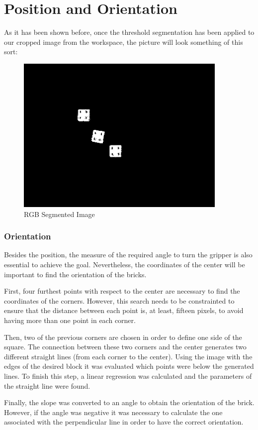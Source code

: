 \chapter{Position and Orientation}\label{ch:position_rotation}

As it has been shown before, once the threshold segmentation has been applied to our cropped image from the workspace, the picture will look something of this sort:

\begin{figure}[hb]
  \centering
  \includegraphics[width=4in]{figures/thresh_img.png}
  \caption[thresholded_image] {RGB Segmented Image}
\end{figure}


\subsection*{Orientation}
Besides the position, the measure of the required angle to turn the gripper is also essential to achieve the goal. Nevertheless, the coordinates of the center will be important to find the orientation of the bricks. 

First, four furthest points with respect to the center are necessary to find the coordinates of the corners. However, this search needs to be constrainted to ensure that the distance between each point is, at least, fifteen pixels, to avoid having more than one point in each corner.

Then, two of the previous corners are chosen in order to define one side of the square. The connection between these two corners and the center generates two different straight lines (from each corner to the center). Using the image with the edges of the desired block it was evaluated which points were below the generated lines. To finish this step, a linear regression was calculated and the parameters of the straight line were found.

Finally, the slope was converted to an angle to obtain the orientation of the brick. However, if the angle was negative it was necessary to calculate the one associated with the perpendicular line in order to have the correct orientation.
